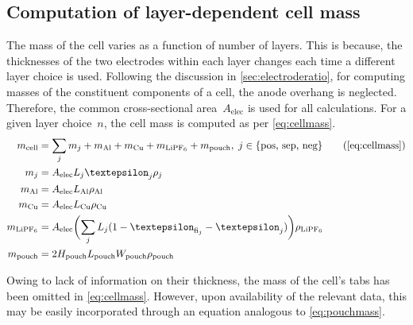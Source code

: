 \subsection{Computation of layer-dependent cell mass}\label{sec:massofonecell}

The mass of the cell varies as a  function of number of layers. This is because,
the thicknesses  of the  two electrodes  within each layer  changes each  time a
different layer choice is used. Following the discussion in
\cref{sec:electroderatio}, for computing masses of the constituent components of
a cell, the anode overhang is neglected. Therefore, the common cross-sectional
area~$A_\text{elec}$ is used for all calculations. For a given layer choice~$n$,
the cell mass is computed as per \cref{eq:cellmass}.
\begin{subequations}\label{eq:cellmass}
    \begin{align}
        m_\mathrm{cell} &= \sum\limits_{j}m_j + m_\mathrm{Al} + m_\mathrm{Cu} + m_\mathrm{LiPF_6} + m_\mathrm{pouch}, \; j \in  \{\text{pos, sep, neg}\}\tag{\ref*{eq:cellmass}}\\
        m_j &=   A_\mathrm{elec}  L_j \varepsilon_j\rho_j\label{eq:mj}\\
        m_\text{Al} &=   A_\mathrm{elec}  L_\text{Al} \rho_\text{Al}\label{eq:Almass}\\
        m_\text{Cu} &=   A_\mathrm{elec}  L_\text{Cu} \rho_\text{Cu}\label{eq:cumass}\\
        m_\mathrm{LiPF_6} &=   A_\mathrm{elec} \biggl(\sum\limits_{j} L_j (1-
        \varepsilon_{\text{fi}_j}-\varepsilon_j)\biggr)\rho_\mathrm{LiPF_6}\label{eq:lipf6mass} \\
            m_\mathrm{pouch} &= 2H_\mathrm{pouch} L_\mathrm{pouch} W_\mathrm{pouch}
            \rho_\mathrm{pouch}\label{eq:pouchmass}
    \end{align}
\end{subequations}


Owing to lack of information on their thickness, the mass of the cell's tabs has
been omitted in \cref{eq:cellmass}. However, upon availability of the relevant
data, this may be easily incorporated through an equation analogous to
\cref{eq:pouchmass}.

